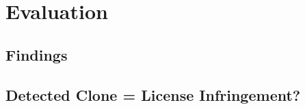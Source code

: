 
\chapter{Evaluation}\label{chapter:evaluation}
\section{Findings}
\section{Detected Clone = License Infringement?}